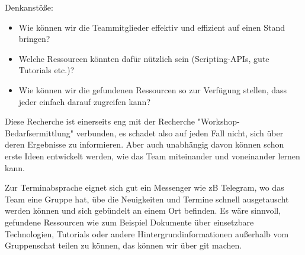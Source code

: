 Denkanstöße:
\begin{itemize}
\item Wie können wir die Teammitglieder effektiv und effizient auf einen Stand bringen?
\item Welche Ressourcen könnten dafür nützlich sein (Scripting-APIs, gute Tutorials etc.)?
\item Wie können wir die gefundenen Ressourcen so zur Verfügung stellen, dass jeder einfach darauf zugreifen kann?
\end{itemize}
Diese Recherche ist einerseits eng mit der Recherche "Workshop-Bedarfsermittlung" verbunden, es schadet also auf jeden Fall nicht, sich über deren Ergebnisse zu informieren. Aber auch unabhängig davon können schon erste Ideen entwickelt werden, wie das Team miteinander und voneinander lernen kann.

Zur Terminabsprache eignet sich gut ein Messenger wie zB Telegram, wo das Team eine Gruppe hat, übe die Neuigkeiten und Termine schnell ausgetauscht werden können und sich gebündelt an einem Ort befinden. 
\nsecend
{}
Es wäre sinnvoll, gefundene Ressourcen wie zum Beispiel Dokumente über einsetzbare Technologien, Tutorials oder andere Hintergrundinformationen außerhalb vom Gruppenschat teilen zu können, das können wir über git machen. 
\nsecend


\nsecend


